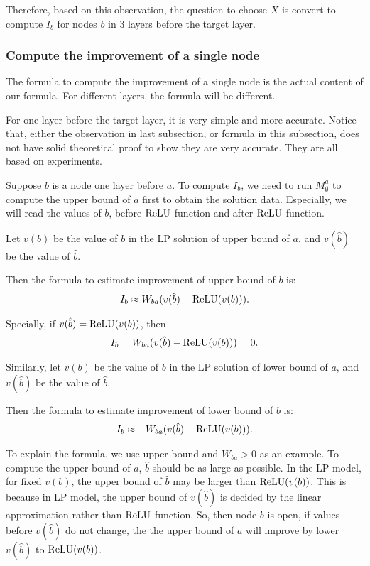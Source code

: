 Therefore, based on this observation, the question to choose $X$ is convert to compute $I_b$ for nodes $b$ in 3 layers before the target layer.

\subsubsection*{Compute the improvement of a single node}

The formula to compute the improvement of a single node is the actual content of our formula. For different layers, the formula will be different.

For one layer before the target layer, it is very simple and more accurate. Notice that, either the observation in last subsection, or formula in this subsection, does not have solid theoretical proof to show they are very accurate. They are all based on experiments. 

Suppose $b$ is a node one layer before $a$. To compute $I_b$, we need to run $M^a_{\emptyset}$ to compute the upper bound of $a$ first to obtain the solution data. Especially, we will read the values of $b$, before $\mathrm{ReLU}$ function and after $\mathrm{ReLU}$ function.

\begin{definition}
	Let $v(b)$ be the value of $b$ in the LP solution of upper bound of $a$, and $v(\hat{b})$ be the value of $\hat{b}$.
	
	Then the formula to estimate improvement of upper bound of $b$ is: \begin{align*}
		I_b \approx W_{ba}(v(\hat{b})-\mathrm{ReLU}(v(b))).
	\end{align*}
	
	Specially, if $v(\hat{b})=\mathrm{ReLU}(v(b))$, then \begin{align*}
		I_b = W_{ba}(v(\hat{b})-\mathrm{ReLU}(v(b))) = 0.
	\end{align*}
	
	
	Similarly, let $v(b)$ be the value of $b$ in the LP solution of lower bound of $a$, and $v(\hat{b})$ be the value of $\hat{b}$.
	
	Then the formula to estimate improvement of lower bound of $b$ is: \begin{align*}
		I_b \approx -W_{ba}(v(\hat{b})-\mathrm{ReLU}(v(b))).
	\end{align*}
	
\end{definition}

To explain the formula, we use upper bound and $W_{ba} > 0$ as an example. To compute the upper bound of $a$, $\hat{b}$ should be as large as possible. In the LP model, for fixed $v(b)$, the upper bound of $\hat{b}$ may be larger than $\mathrm{ReLU}(v(b))$. This is because in LP model, the upper bound of $v(\hat{b})$ is decided by the linear approximation rather than $\mathrm{ReLU}$ function. So, then node $b$ is open, if values before $v(\hat{b})$ do not change, the the upper bound of $a$ will improve by lower $v(\hat{b})$ to $\mathrm{ReLU}(v(b))$.
 			
